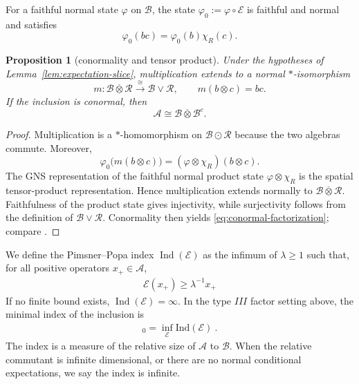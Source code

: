 \documentclass[a4paper,11pt]{article}
\newtheorem{proposition}[theorem]{Proposition}
\theoremstyle{definition}
\newcommand{\mA}{\mathcal{A}}
\newcommand{\mB}{\mathcal{B}}
\newcommand{\mE}{\mathcal{E}}
\begin{document}
For a faithful normal state $\varphi$ on $\mathcal B$, the state
$\varphi_0:=\varphi\circ \mE$ is faithful and normal and satisfies
\begin{equation}
 \varphi_0(b c)=\varphi_0(b)\chi_R(c).
\end{equation}

\begin{proposition}[conormality and tensor product]\label{prop:conormal-factorization}
Under the hypotheses of Lemma~\ref{lem:expectation-slice}, multiplication
extends to a normal $*$-isomorphism
\begin{equation}
 m:\mathcal B\overline\otimes\mathcal R
 \overset{\cong}{\longrightarrow}\mathcal B\vee\mathcal R,
 \qquad m(b\otimes c)=b c.
\end{equation}
If the inclusion is conormal, then
\begin{equation}\label{eq:conormal-factorization}
\mathcal A\cong
 \mathcal B\overline\otimes \mB^c .
\end{equation}
\end{proposition}

\begin{proof}
Multiplication is a $*$-homomorphism on $\mathcal B\odot\mathcal R$ because
the two algebras commute.  Moreover,
\begin{equation}
 \varphi_0\bigl(m(b\otimes c)\bigr)
 =(\varphi\otimes\chi_R)(b\otimes c).
\end{equation}
The GNS representation of the faithful normal product state
$\varphi\otimes\chi_R$ is the spatial tensor-product representation.  Hence
multiplication extends normally to $\mathcal B\overline\otimes\mathcal R$.
Faithfulness of the product state gives injectivity, while surjectivity follows
from the definition of $\mathcal B\vee\mathcal R$.  Conormality then yields
\eqref{eq:conormal-factorization}; compare
\cite{Faulkner2020,FaulknerSperanza2024}.
\end{proof}

We define the Pimsner--Popa index $\operatorname{Ind}(\mE)$ as the infimum of $\lambda\geq1$ such that, for all positive operators $x_+\in\mA$,
\begin{align}
    \mE(x_+)\geq \lambda^{-1}x_+
\end{align}
If no finite bound exists, $\operatorname{Ind}(\mE)=\infty$. In the type $III$ factor setting above, the minimal index of the inclusion is
\begin{align}
    [\mA:\mB]_0=\inf_\mE \text{Ind}(\mE)\ .
\end{align}
The index is a measure of the relative size of $\mA$ to $\mB$. When the relative commutant is infinite dimensional, or there are no normal conditional expectations, we say the index is infinite.
\end{document}
